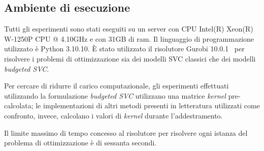 \subsection{Ambiente di esecuzione}
Tutti gli esperimenti sono stati eseguiti su un server con CPU Intel(R) Xeon(R) W-1250P CPU @ 4.10GHz e con 31GB di ram. Il linguaggio di programmazione utilizzato è Python 3.10.10. \`E stato utilizzato il risolutore Gurobi 10.0.1~\cite{gurobi} per risolvere i problemi di ottimizzazione sia dei modelli SVC classici che dei modelli \emph{budgeted SVC}.

Per cercare di ridurre il carico computazionale, gli esperimenti effettuati utilizzando la formulazione \emph{budgeted SVC} utilizzano una matrice \emph{kernel} pre-calcolata; le implementazioni di altri metodi presenti in letteratura utilizzati come confronto, invece, calcolano i valori di \emph{kernel} durante l'addestramento.

Il limite massimo di tempo concesso al risolutore per risolvere ogni istanza del problema di ottimizzazione è di sessanta secondi.

